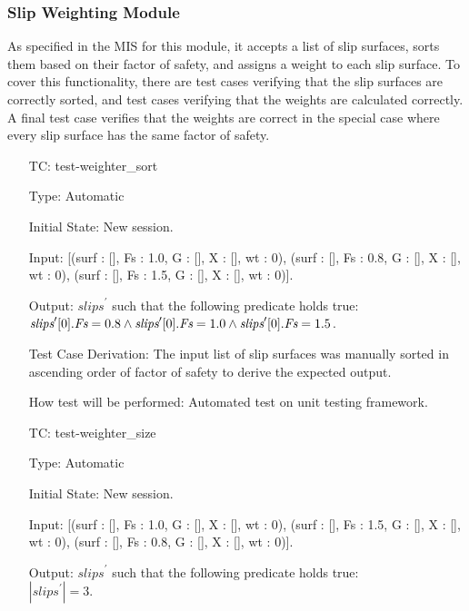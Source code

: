 \documentclass[12pt, titlepage]{article}
\newcounter{utestnum} %
\begin{document}
\subsubsection{Slip Weighting Module}
As specified in the MIS for this module, it accepts a list of slip surfaces, 
sorts them based on their factor of safety, and assigns a weight to each slip 
surface. To cover this functionality, there are test cases verifying that the 
slip surfaces are correctly sorted, and test cases verifying that the 
weights are calculated correctly. A final test case verifies that the weights 
are correct in the special case where every slip surface has the same factor of 
safety.

\begin{enumerate}[label=TC\arabic*:,ref={\arabic*}]
	
	\item [TC\refstepcounter{utestnum}\theutestnum: \label{TC_WeighterSort}] 
	test-weighter\_sort
	
	Type: Automatic
	
	Initial State: New session.
	
	Input: [(surf : [], Fs : 1.0, G : [], X : [], wt : 0), (surf : [], Fs : 
	0.8, G : [], X : [], wt : 0), (surf : [], Fs : 1.5, G : [], X : [], wt : 
	0)].
	
	Output: $\textit{slips}^\prime$ such that the following predicate holds 
	true:\\ 
	$\textit{slips}^\prime[0].\textit{Fs} = 0.8\\ 
	\land \textit{slips}^\prime[0].\textit{Fs} = 1.0 \\
	\land \textit{slips}^\prime[0].\textit{Fs} = 1.5$.
	
	Test Case Derivation: The input list of slip surfaces was manually sorted 
	in ascending order of factor of safety to derive the expected output.
	
	How test will be performed: Automated test on unit testing framework.
	
	\item [TC\refstepcounter{utestnum}\theutestnum: \label{TC_WeighterSize}] 
	test-weighter\_size
	
	Type: Automatic
	
	Initial State: New session.
	
	Input: [(surf : [], Fs : 1.0, G : [], X : [], wt : 0), (surf : [], Fs : 
	1.5, G : [], X : [], wt : 0), (surf : [], Fs : 0.8, G : [], X : [], wt : 
	0)].
	
	Output: $\textit{slips}^\prime$ such that the following predicate holds 
	true:\\ 
	$|\textit{slips}^\prime| = 3$.
	

\end{enumerate}
\end{document}
